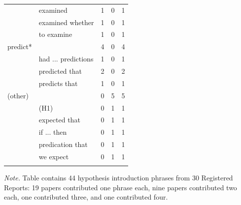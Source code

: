 \documentclass[british,,jou,floatsintext]{apa6}
\begin{document}
\begin{table}[tbp]
\begin{center}
\begin{threeparttable}
{\begin{tabular}{llrrr}
 & examined & 1 & 0 & 1\\
 & examined whether & 1 & 0 & 1\\
 & to examine & 1 & 0 & 1\\ \midrule
predict* &  & 4 & 0 & 4\\
 & had ... predictions & 1 & 0 & 1\\
 & predicted that & 2 & 0 & 2\\
 & predicts that & 1 & 0 & 1\\ \midrule
(other) &  & 0 & 5 & 5\\
 & (H1) & 0 & 1 & 1\\
 & expected that & 0 & 1 & 1\\
 & if ... then & 0 & 1 & 1\\
 & predication that & 0 & 1 & 1\\
 & we expect & 0 & 1 & 1\\
\bottomrule
\addlinespace
\end{tabular}

}

\begin{tablenotes}[para]
\normalsize{\textit{Note.} Table contains 44 hypothesis introduction phrases from 30 Registered Reports: 19 papers contributed one phrase each, nine papers contributed two each, one contributed three, and one contributed four.}
\end{tablenotes}

\end{threeparttable}
\end{center}

\end{table}
\end{document}
